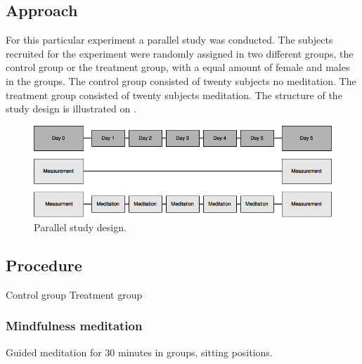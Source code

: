 \subsection{Approach}
For this particular experiment a parallel study was conducted. The subjects recruited for the experiment were randomly assigned in two different groups, the control group or the treatment group, with a equal amount of female and males in the groups. The control group consisted of twenty subjects no meditation. The treatment group consisted of twenty subjects meditation. The structure of the study design is illustrated on .


\begin{figure}[H]
	\includegraphics[width=1\textwidth]{figures/studydesign.png} 
	\caption{Parallel study design.}
	\label{fig:studydesign}  
\end{figure}  

\subsection{Procedure}

Control group
Treatment group

\subsubsection{Mindfulness meditation}
Guided meditation for 30 minutes in groups, sitting positions. 